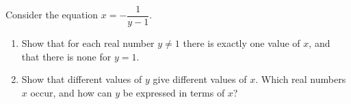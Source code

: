 Consider the equation $x=-\dfrac{1}{y-1}$.
\begin{enumerate}
\item[(a)] Show that for each real number $y\ne1$ there is exactly one value of $x$, and that there is none for $y=1$.
\item[(b)] Show that different values of $y$ give different values of $x$. Which real numbers $x$ occur, and how can $y$ be expressed in terms of $x$?
\end{enumerate}
